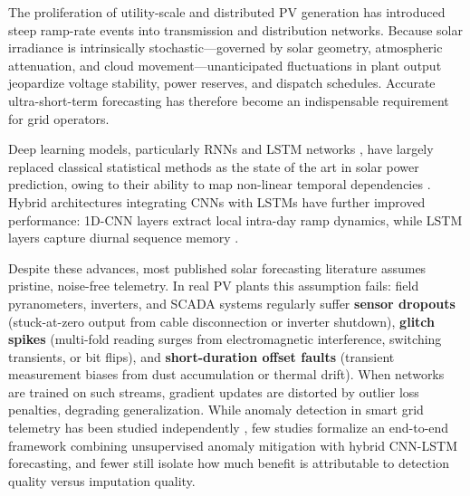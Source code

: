 \documentclass[conference]{IEEEtran}
\begin{document}
The proliferation of utility-scale and distributed PV generation has introduced steep ramp-rate events into transmission and distribution networks. Because solar irradiance is intrinsically stochastic---governed by solar geometry, atmospheric attenuation, and cloud movement---unanticipated fluctuations in plant output jeopardize voltage stability, power reserves, and dispatch schedules. Accurate ultra-short-term forecasting has therefore become an indispensable requirement for grid operators.

Deep learning models, particularly RNNs and LSTM networks \cite{hochreiter1997lstm}, have largely replaced classical statistical methods as the state of the art in solar power prediction, owing to their ability to map non-linear temporal dependencies \cite{mellit2021deep, sobri2018review}. Hybrid architectures integrating CNNs with LSTMs have further improved performance: 1D-CNN layers extract local intra-day ramp dynamics, while LSTM layers capture diurnal sequence memory \cite{zang2020cnnlstm, obiora2021hourly, qu2021dayahead, boucetta2024enhanced}.

Despite these advances, most published solar forecasting literature assumes pristine, noise-free telemetry. In real PV plants this assumption fails: field pyranometers, inverters, and SCADA systems regularly suffer \textbf{sensor dropouts} (stuck-at-zero output from cable disconnection or inverter shutdown), \textbf{glitch spikes} (multi-fold reading surges from electromagnetic interference, switching transients, or bit flips), and \textbf{short-duration offset faults} (transient measurement biases from dust accumulation or thermal drift). When networks are trained on such streams, gradient updates are distorted by outlier loss penalties, degrading generalization. While anomaly detection in smart grid telemetry has been studied independently \cite{zhang2021survey}, few studies formalize an end-to-end framework combining unsupervised anomaly mitigation with hybrid CNN-LSTM forecasting, and fewer still isolate how much benefit is attributable to detection quality versus imputation quality.
\end{document}
